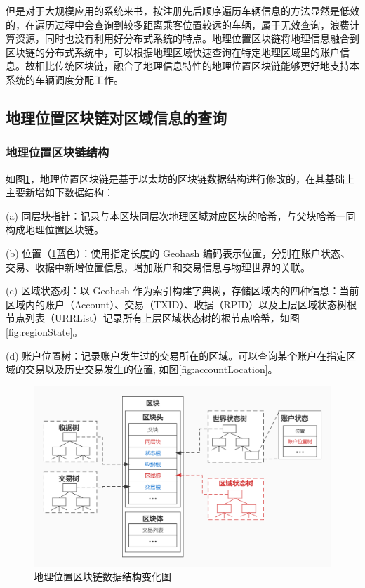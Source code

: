 但是对于大规模应用的系统来书，按注册先后顺序遍历车辆信息的方法显然是低效的，在遍历过程中会查询到较多距离乘客位置较远的车辆，属于无效查询，浪费计算资源，同时也没有利用好分布式系统的特点。地理位置区块链将地理信息融合到区块链的分布式系统中，可以根据地理区域快速查询在特定地理区域里的账户信息。故相比传统区块链，融合了地理信息特性的地理位置区块链能够更好地支持本系统的车辆调度分配工作。

\subsection{地理位置区块链对区域信息的查询}
\subsubsection{地理位置区块链结构}
如图\ref{fig:treeBlockchain}，地理位置区块链是基于以太坊的区块链数据结构进行修改的，在其基础上主要新增如下数据结构：

(a) 同层块指针：记录与本区块同层次地理区域对应区块的哈希，与父块哈希一同构成地理位置区块链。

(b) 位置（\ref{fig:treeBlockchain}蓝色）：使用指定长度的 Geohash 编码表示位置，分别在账户状态、交易、收据中新增位置信息，增加账户和交易信息与物理世界的关联。

(c) 区域状态树：以 Geohash 作为索引构建字典树，存储区域内的四种信息：当前区域内的账户（Account）、交易（TXID）、收据（RPID）以及上层区域状态树根节点列表（URRList）记录所有上层区域状态树的根节点哈希，如图\ref{fig:regionState}。

(d) 账户位置树：记录账户发生过的交易所在的区域。可以查询某个账户在指定区域的交易以及历史交易发生的位置, 如图\ref{fig:accountLocation}。

\begin{figure}[h]
  \centering
  \includegraphics[width=1.0\textwidth]{figures/树状区块链}
  \caption{地理位置区块链数据结构变化图}\label{fig:treeBlockchain}
\end{figure}

